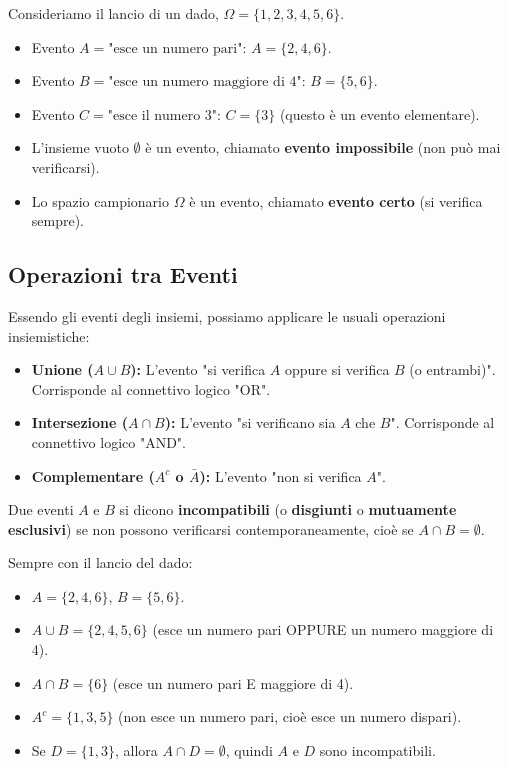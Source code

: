 \documentclass[12pt,a4paper]{article}
\begin{document}
\begin{example}
Consideriamo il lancio di un dado, $\Omega = \{1, 2, 3, 4, 5, 6\}$.
\begin{itemize}
    \item Evento $A = \text{"esce un numero pari"}$: $A = \{2, 4, 6\}$.
    \item Evento $B = \text{"esce un numero maggiore di 4"}$: $B = \{5, 6\}$.
    \item Evento $C = \text{"esce il numero 3"}$: $C = \{3\}$ (questo è un evento elementare).
    \item L'insieme vuoto $\emptyset$ è un evento, chiamato \textbf{evento impossibile} (non può mai verificarsi).
    \item Lo spazio campionario $\Omega$ è un evento, chiamato \textbf{evento certo} (si verifica sempre).
\end{itemize}
\end{example}

\subsection{Operazioni tra Eventi}
Essendo gli eventi degli insiemi, possiamo applicare le usuali operazioni insiemistiche:
\begin{itemize}
    \item \textbf{Unione ($A \cup B$):} L'evento "si verifica $A$ oppure si verifica $B$ (o entrambi)". Corrisponde al connettivo logico "OR".
    \item \textbf{Intersezione ($A \cap B$):} L'evento "si verificano sia $A$ che $B$". Corrisponde al connettivo logico "AND".
    \item \textbf{Complementare ($A^c$ o $\bar{A}$):} L'evento "non si verifica $A$".
\end{itemize}
Due eventi $A$ e $B$ si dicono \textbf{incompatibili} (o \textbf{disgiunti} o \textbf{mutuamente esclusivi}) se non possono verificarsi contemporaneamente, cioè se $A \cap B = \emptyset$.

\begin{example}
Sempre con il lancio del dado:
\begin{itemize}
    \item $A = \{2, 4, 6\}$, $B = \{5, 6\}$.
    \item $A \cup B = \{2, 4, 5, 6\}$ (esce un numero pari OPPURE un numero maggiore di 4).
    \item $A \cap B = \{6\}$ (esce un numero pari E maggiore di 4).
    \item $A^c = \{1, 3, 5\}$ (non esce un numero pari, cioè esce un numero dispari).
    \item Se $D = \{1, 3\}$, allora $A \cap D = \emptyset$, quindi $A$ e $D$ sono incompatibili.
\end{itemize}
\end{example}
\end{document}
